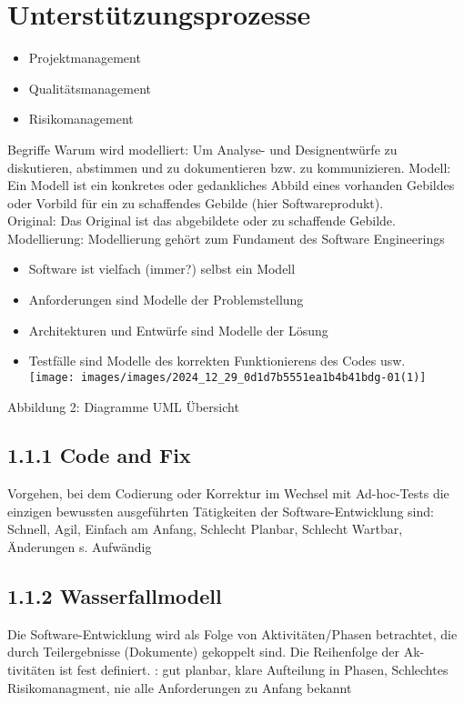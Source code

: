 \section*{Unterstützungsprozesse}
\begin{itemize}
  \item Projektmanagement
  \item Qualitätsmanagement
  \item Risikomanagement
\end{itemize}

Begriffe Warum wird modelliert: Um Analyse- und Designentwürfe zu diskutieren, abstimmen und zu dokumentieren bzw. zu kommunizieren. Modell: Ein Modell ist ein konkretes oder gedankliches Abbild eines vorhanden Gebildes oder Vorbild für ein zu schaffendes Gebilde (hier Softwareprodukt).\\
Original: Das Original ist das abgebildete oder zu schaffende Gebilde.\\
Modellierung: Modellierung gehört zum Fundament des Software Engineerings

\begin{itemize}
  \item Software ist vielfach (immer?) selbst ein Modell
  \item Anforderungen sind Modelle der Problemstellung
  \item Architekturen und Entwürfe sind Modelle der Lösung
  \item Testfälle sind Modelle des korrekten Funktionierens des Codes usw.\\
\texttt{[image: images/images/2024\_12\_29\_0d1d7b5551ea1b4b41bdg-01(1)]}
\end{itemize}

Abbildung 2: Diagramme UML Übersicht

\subsection*{1.1.1 Code and Fix}
Vorgehen, bei dem Codierung oder Korrektur im Wechsel mit Ad-hoc-Tests die einzigen bewussten ausgeführten Tätigkeiten der Software-Entwicklung sind: Schnell, Agil, Einfach am Anfang, Schlecht Planbar, Schlecht Wartbar, Änderungen s. Aufwändig

\subsection*{1.1.2 Wasserfallmodell}
Die Software-Entwicklung wird als Folge von Aktivitäten/Phasen betrachtet, die durch Teilergebnisse (Dokumente) gekoppelt sind. Die Reihenfolge der Ak-\\
tivitäten ist fest definiert. : gut planbar, klare Aufteilung in Phasen, Schlechtes Risikomanagment, nie alle Anforderungen zu Anfang bekannt

